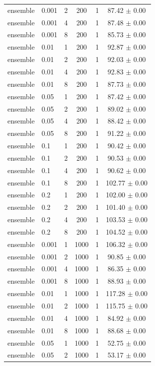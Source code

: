 \begin{longtable}{llcccc}
ensemble & 0.001 & 2 & 200 & 1 & 87.42 $\pm$ 0.00 \\
ensemble & 0.001 & 4 & 200 & 1 & 87.48 $\pm$ 0.00 \\
ensemble & 0.001 & 8 & 200 & 1 & 85.73 $\pm$ 0.00 \\
ensemble & 0.01 & 1 & 200 & 1 & 92.87 $\pm$ 0.00 \\
ensemble & 0.01 & 2 & 200 & 1 & 92.03 $\pm$ 0.00 \\
ensemble & 0.01 & 4 & 200 & 1 & 92.83 $\pm$ 0.00 \\
ensemble & 0.01 & 8 & 200 & 1 & 87.73 $\pm$ 0.00 \\
ensemble & 0.05 & 1 & 200 & 1 & 87.42 $\pm$ 0.00 \\
ensemble & 0.05 & 2 & 200 & 1 & 89.02 $\pm$ 0.00 \\
ensemble & 0.05 & 4 & 200 & 1 & 88.42 $\pm$ 0.00 \\
ensemble & 0.05 & 8 & 200 & 1 & 91.22 $\pm$ 0.00 \\
ensemble & 0.1 & 1 & 200 & 1 & 90.42 $\pm$ 0.00 \\
ensemble & 0.1 & 2 & 200 & 1 & 90.53 $\pm$ 0.00 \\
ensemble & 0.1 & 4 & 200 & 1 & 90.62 $\pm$ 0.00 \\
ensemble & 0.1 & 8 & 200 & 1 & 102.77 $\pm$ 0.00 \\
ensemble & 0.2 & 1 & 200 & 1 & 102.00 $\pm$ 0.00 \\
ensemble & 0.2 & 2 & 200 & 1 & 101.40 $\pm$ 0.00 \\
ensemble & 0.2 & 4 & 200 & 1 & 103.53 $\pm$ 0.00 \\
ensemble & 0.2 & 8 & 200 & 1 & 104.52 $\pm$ 0.00 \\
ensemble & 0.001 & 1 & 1000 & 1 & 106.32 $\pm$ 0.00 \\
ensemble & 0.001 & 2 & 1000 & 1 & 90.85 $\pm$ 0.00 \\
ensemble & 0.001 & 4 & 1000 & 1 & 86.35 $\pm$ 0.00 \\
ensemble & 0.001 & 8 & 1000 & 1 & 88.93 $\pm$ 0.00 \\
ensemble & 0.01 & 1 & 1000 & 1 & 117.28 $\pm$ 0.00 \\
ensemble & 0.01 & 2 & 1000 & 1 & 115.75 $\pm$ 0.00 \\
ensemble & 0.01 & 4 & 1000 & 1 & 84.92 $\pm$ 0.00 \\
ensemble & 0.01 & 8 & 1000 & 1 & 88.68 $\pm$ 0.00 \\
ensemble & 0.05 & 1 & 1000 & 1 & 52.75 $\pm$ 0.00 \\
ensemble & 0.05 & 2 & 1000 & 1 & 53.17 $\pm$ 0.00 \\

\end{longtable}
